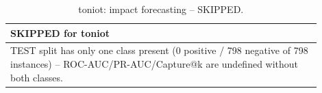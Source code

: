 \begin{table}[t]
\centering
\caption{toniot: impact forecasting -- SKIPPED.}
\label{tab:toniot_impact_forecasting}
\begin{tabular}{p{0.9\linewidth}}
\toprule
\textbf{SKIPPED for toniot} \\
\midrule
TEST split has only one class present (0 positive / 798 negative of 798 instances) -- ROC-AUC/PR-AUC/Capture@k are undefined without both classes. \\
\bottomrule
\end{tabular}
\end{table}

